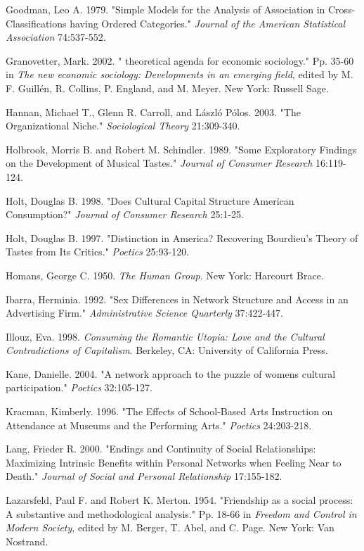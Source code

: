 Goodman, Leo A. 1979. "Simple Models for the Analysis of Association in Cross-Classifications having Ordered Categories." \emph{Journal of the American Statistical Association} 74:537-552.

Granovetter, Mark. 2002. " theoretical agenda for economic sociology." Pp. 35-60 in \emph{The new economic sociology: Developments in an emerging field}, edited by M. F. Guillén, R. Collins, P. England, and M. Meyer. New York: Russell Sage.

Hannan, Michael T., Glenn R. Carroll, and László Pólos. 2003. "The Organizational Niche." \emph{Sociological Theory} 21:309-340.

Holbrook, Morris B. and Robert M. Schindler. 1989. "Some Exploratory Findings on the Development of Musical Tastes." \emph{Journal of Consumer Research} 16:119-124.

Holt, Douglas B. 1998. "Does Cultural Capital Structure American Consumption?" \emph{Journal of Consumer Research} 25:1-25.

Holt, Douglas B. 1997. "Distinction in America? Recovering Bourdieu's Theory of Tastes from Its Critics." \emph{Poetics} 25:93-120.

Homans, George C. 1950. \emph{The Human Group}. New York: Harcourt Brace.

Ibarra, Herminia. 1992. "Sex Differences in Network Structure and Access in an Advertising Firm." \emph{Administrative Science Quarterly} 37:422-447.

Illouz, Eva. 1998. \emph{Consuming the Romantic Utopia: Love and the Cultural Contradictions of Capitalism}. Berkeley, CA: University of California Press.

Kane, Danielle. 2004. "A network approach to the puzzle of women\textquotesingle s cultural participation." \emph{Poetics} 32:105-127.

Kracman, Kimberly. 1996. "The Effects of School-Based Arts Instruction on Attendance at Museums and the Performing Arts." \emph{Poetics} 24:203-218.

Lang, Frieder R. 2000. "Endings and Continuity of Social Relationships: Maximizing Intrinsic Benefits within Personal Networks when Feeling Near to Death." \emph{Journal of Social and Personal Relationship} 17:155-182.

Lazarsfeld, Paul F. and Robert K. Merton. 1954. "Friendship as a social process: A substantive and methodological analysis." Pp. 18-66 in \emph{Freedom and Control in Modern Society}, edited by M. Berger, T. Abel, and C. Page. New York: Van Nostrand.

